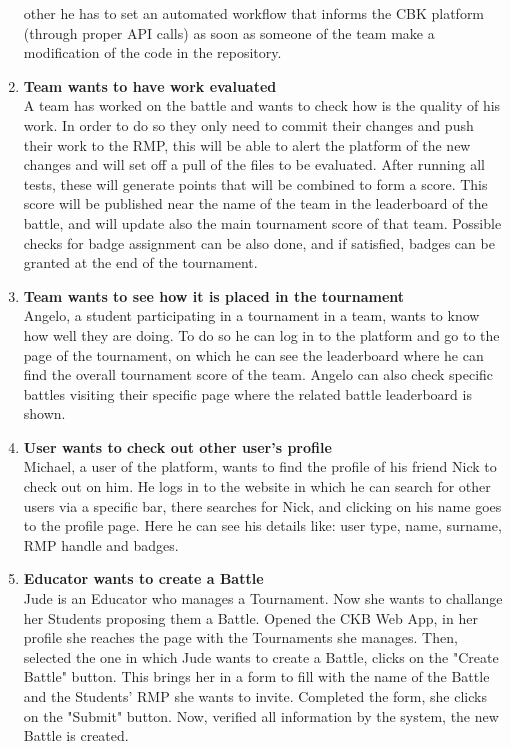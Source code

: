 \begin{enumerate}[label=$\bullet$ \textbf{SC\arabic*:}]
    other he has to set an automated workflow that informs the CBK platform (through proper API calls) as soon as someone of the team make a modification of the code in the repository.
    \item \textbf{Team wants to have work evaluated}\\ A team has worked on the battle and wants to check how is the quality of his work. In order to do so they only need to commit their changes and push their work to the RMP, 
    this will be able to alert the platform of the new changes and will set off a pull of the files to be evaluated. After running all tests, these will generate points that will be combined to form a score. This score will be 
    published near the name of the team in the leaderboard of the battle, and will update also the main tournament score of that team. Possible checks for badge assignment can be also done, and if satisfied, badges can be granted at 
    the end of the tournament.
    \item \textbf{Team wants to see how it is placed in the tournament}\\ Angelo, a student participating in a tournament in a team, wants to know how well they are doing. To do so he can log in to the platform and go to the page 
    of the tournament, on which he can see the leaderboard where he can find the overall tournament score of the team. Angelo can also check specific battles visiting their specific page where the related battle leaderboard is shown.
    \item \textbf{User wants to check out other user's profile}\\ Michael, a user of the platform, wants to find the profile of his friend Nick to check out on him. He logs in to the website in which he can search for other users 
    via a specific bar, there searches for Nick, and clicking on his name goes to the profile page. Here he can see his details like: user type, name, surname, RMP handle and badges.
    \item \textbf{Educator wants to create a Battle}\\Jude is an Educator who manages a Tournament. Now she wants to challange her Students proposing them a Battle. Opened the CKB Web App, in her profile she reaches the page with 
    the Tournaments she manages. Then, selected the one in which Jude wants to create a Battle, clicks on the "Create Battle" button. This brings her in a form to fill with the name of the Battle and the Students' RMP she wants to invite.
    Completed the form, she clicks on the "Submit" button. Now, verified all information by the system, the new Battle is created.

\end{enumerate}

